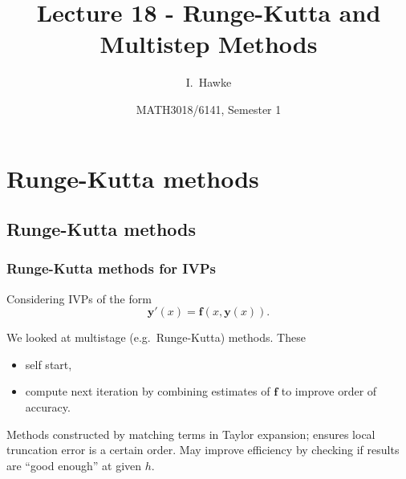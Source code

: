 \documentclass{beamer}
\title[Lecture 18] %
{Lecture 18 - Runge-Kutta and Multistep Methods}
\author[I. Hawke] %
{I.~Hawke}
\institute[University of Southampton] %
{
  School of Mathematics, \\
  University of Southampton, UK
}
\date[Semester 1] %
{MATH3018/6141, Semester 1}
\newcommand{\by}{{\boldsymbol{y}}}
\newcommand{\bfm}[1]{{\boldsymbol{#1}}}
\begin{document}
\begin{frame}
  \titlepage
\end{frame}

\section{Runge-Kutta methods}

\subsection{Runge-Kutta methods}

\begin{frame}
  \frametitle{Runge-Kutta methods for IVPs}

  Considering IVPs of the form
  \begin{equation*}
    \by'(x) = \bfm{f}(x, \by(x)).
  \end{equation*}

  We looked at multistage (e.g.\ Runge-Kutta) methods. These
  \begin{itemize}
  \item self start,
  \item  compute next iteration by combining estimates of $\bfm{f}$ to
    improve order of accuracy.
  \end{itemize} \pause

  \vspace{1ex}

  Methods constructed by matching terms in Taylor expansion; ensures
  local truncation error is a certain order. May improve efficiency by
  checking if results are ``good enough'' at given $h$.

\end{frame}
\end{document}
